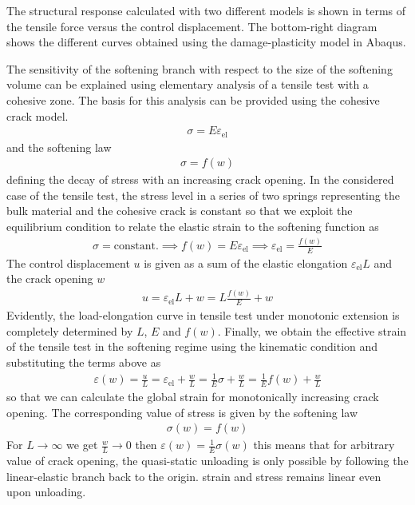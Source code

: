 \documentclass[main.tex]{subfiles}
\begin{document}
The structural response calculated with two different models is shown in terms of the tensile force  versus the control displacement. The bottom-right diagram shows the different curves obtained using the damage-plasticity model in Abaqus.

The sensitivity of the softening branch with respect to the size of the softening volume can be explained using elementary analysis of a tensile test with a cohesive zone. The basis for this analysis can be provided using the cohesive crack model.
\begin{align}
\sigma = E \varepsilon_\mathrm{el}
\end{align}
and the softening law
\begin{align}
\sigma = f(w)
\end{align}
defining the decay of stress  with an increasing crack opening. In the considered case of the tensile test, the stress level in a series of two springs representing the bulk material and the cohesive crack is constant so that we exploit the equilibrium condition to relate the elastic strain to the softening function as
\begin{align}
\sigma = \mathrm{constant.} \implies f(w) = E \varepsilon_\mathrm{el}
\implies \varepsilon_\mathrm{el} = \frac{f(w)}{E}
\end{align}
The control displacement $u$ is given as a sum of the elastic elongation $\varepsilon_{\mathrm{el}} L$ and the crack opening  $w$
\begin{align}
u = \varepsilon_{\mathrm{el}} L  + w = L \frac{f(w)}{E} + w
\end{align}
Evidently, the load-elongation curve in tensile test under monotonic extension is completely determined by $L$, $E$  and $f(w)$.  Finally, we obtain the effective strain of the tensile test in the softening regime using the kinematic condition and substituting the terms above as
\begin{align}
\varepsilon(w) = \frac{u}{L} = \varepsilon_\mathrm{el}  + \frac{w}{L}
= \frac{1}{E} \sigma + \frac{w}{L}
= \frac{1}{E} f(w) + \frac{w}{L}
\end{align}
so that we can calculate the global strain for monotonically increasing crack opening. The corresponding value of stress is given by the softening law
\begin{align}
\sigma(w) = f(w)
\end{align}
For $L \rightarrow \infty$ we get $\frac{w}{L} \rightarrow 0$ then 
$\varepsilon(w) = \frac{1}{E} \sigma(w)$
this means that for arbitrary value of crack opening, the quasi-static unloading  is only possible by following the linear-elastic branch back to the origin. strain and stress remains linear even upon unloading.
\end{document}
